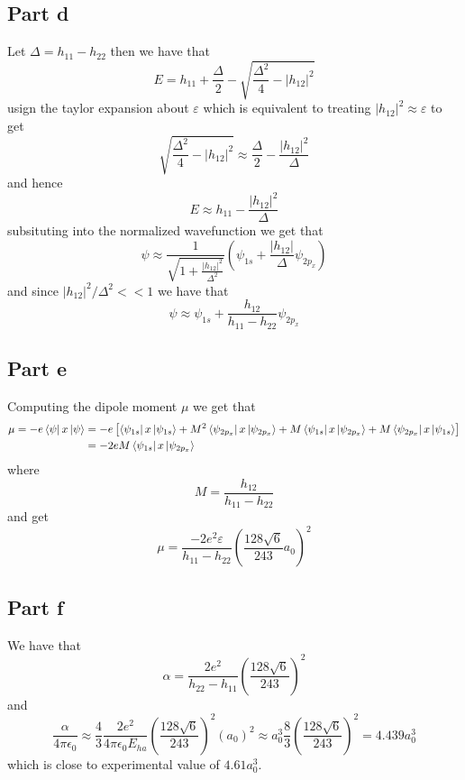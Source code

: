 \documentclass[12pt]{report}
\begin{document}
\subsection*{Part d}
Let $\Delta = h_{11} - h_{22}$ then we have that
\begin{equation*}
  E = h_{11} + \frac{\Delta}{2} - \sqrt{\frac{\Delta^2}{4} - |h_{12}|^2}
\end{equation*}
usign the taylor expansion about $\varepsilon$ which is equivalent to treating $|h_{12}|^2 \approx \varepsilon$ to get
\begin{equation*}
\sqrt{\frac{\Delta^2}{4} - |h_{12}|^2} \approx \frac{\Delta}{2} - \frac{|h_{12}|^2}{\Delta} 
\end{equation*}
and hence
\begin{equation*}
  E \approx h_{11} - \frac{|h_{12}|^2}{\Delta}
\end{equation*}
subsituting into the normalized wavefunction we get that
\begin{equation*}
  \psi \approx \frac{1}{\sqrt{1 + \frac{|h_{12}|^2}{\Delta^2}}}\left(\psi_{1s} + \frac{|h_{12}|}{\Delta}\psi_{2p_x}\right)
\end{equation*}
and since $|h_{12}|^2/\Delta^2 << 1$ we have that 
\begin{equation*}
  \psi \approx \psi_{1s} + \frac{h_{12}}{h_{11}-h_{22}}\psi_{2p_x}
\end{equation*}

\subsection*{Part e}
Computing the dipole moment $\mu$ we get that
\begin{align*}
  \mu = -e\bra{\psi}x\ket{\psi} &= -e \left[\bra{\psi_{1s}}x\ket{\psi_{1s}} + M^2 \bra{\psi_{2p_x}}x\ket{\psi_{2p_x}} + M \bra{\psi_{1s}}x\ket{\psi_{2p_x}} + M \bra{\psi_{2p_x}}x \ket{\psi_{1s}}\right] \\
                                &= -2eM \bra{\psi_{1s}}x\ket{\psi_{2p_x}} \\
\end{align*}
where 
\begin{equation*}
  M = \frac{h_{12}}{h_{11} - h_{22}}
\end{equation*}
and get 
\begin{equation*}
  \mu = \frac{-2e^2\varepsilon}{h_{11} - h_{22}} \left(\frac{128 \sqrt{6}}{243} a_0\right)^2
\end{equation*}

\subsection*{Part f}
We have that
\begin{equation*}
  \alpha =\frac{2e^2}{h_{22} - h_{11}} \left(\frac{128\sqrt{6}}{243}\right)^2 
\end{equation*}
and 
\begin{equation*}
  \frac{ \alpha}{4\pi \epsilon_0} \approx \frac{4}{3}\frac{2e^2}{4\pi \epsilon_0E_{ha}} \left(\frac{128\sqrt{6}}{243}\right)^2 \left(a_0\right)^2 \approx a_0^3 \frac{8}{3}\left(\frac{128\sqrt{6}}{243}\right)^2 = 4.439 a_0^3 
\end{equation*}
which is close to experimental value of $4.61 a_0^3$.
\end{document}
